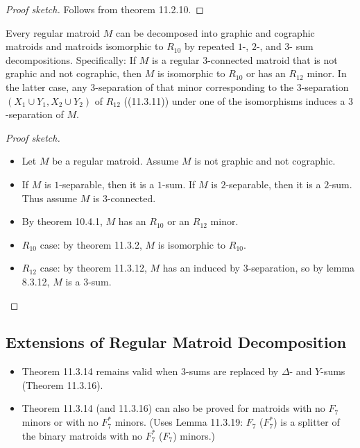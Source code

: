 \begin{proof}[Proof sketch]
  Follows from theorem 11.2.10.
\end{proof}

\begin{theorem}
  \label{thm:11.3.14.seymour_hard}
  Every regular matroid $M$ can be decomposed into graphic and cographic matroids and matroids isomorphic to $R_{10}$ by repeated $1$-, $2$-, and $3$- sum decompositions.
  Specifically: If $M$ is a regular $3$-connected matroid that is not graphic and not cographic, then $M$ is isomorphic to $R_{10}$ or has an $R_{12}$ minor. In the latter case, any $3$-separation of that minor corresponding to the 3-separation $(X_{1} \cup Y_{1}, X_{2} \cup Y_{2})$ of $R_{12}$ ((11.3.11)) under one of the isomorphisms induces a $3$-separation of $M$.
\end{theorem}

\begin{proof}[Proof sketch]
  \begin{itemize}
    \item Let $M$ be a regular matroid. Assume $M$ is not graphic and not cographic.
    \item If $M$ is $1$-separable, then it is a $1$-sum. If $M$ is $2$-separable, then it is a $2$-sum. Thus assume $M$ is $3$-connected.
    \item By theorem 10.4.1, $M$ has an $R_{10}$ or an $R_{12}$ minor.
    \item $R_{10}$ case: by theorem 11.3.2, $M$ is isomorphic to $R_{10}$.
    \item $R_{12}$ case: by theorem 11.3.12, $M$ has an induced by $3$-separation, so by lemma 8.3.12, $M$ is a $3$-sum.
  \end{itemize}
\end{proof}


\subsection{Extensions of Regular Matroid Decomposition}

\begin{itemize}
  \item Theorem 11.3.14 remains valid when $3$-sums are replaced by $\Delta$- and $Y$-sums (Theorem 11.3.16).
  \item Theorem 11.3.14 (and 11.3.16) can also be proved for matroids with no $F_{7}$ minors or with no $F_{7}^{*}$ minors. (Uses Lemma 11.3.19: $F_{7}$ ($F_{7}^{*}$) is a splitter of the binary matroids with no $F_{7}^{*}$ ($F_{7}$) minors.)
\end{itemize}


